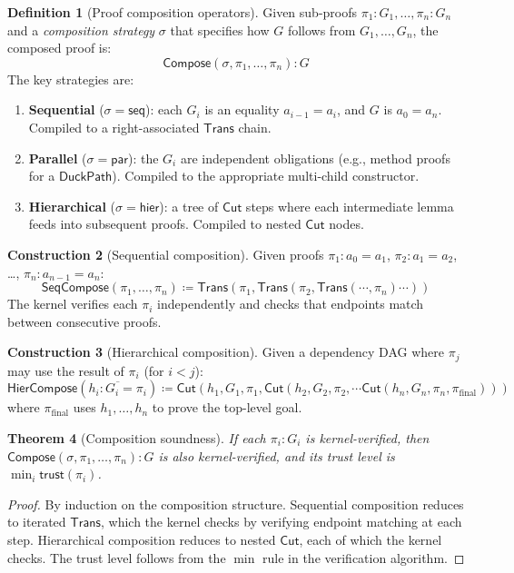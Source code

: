 \documentclass[11pt,a4paper]{report}
\theoremstyle{definition}
\newtheorem{definition}{Definition}[chapter]
\newtheorem{construction}[definition]{Construction}
\theoremstyle{plain}
\newtheorem{theorem}[definition]{Theorem}
\newcommand{\Cut}{\mathsf{Cut}}
\newcommand{\Trans}{\mathsf{Trans}}
\newcommand{\defeq}{\coloneqq}
\begin{document}
\begin{definition}[Proof composition operators]
\label{def:composition}
Given sub-proofs $\pi_1 : G_1, \ldots, \pi_n : G_n$ and a
\emph{composition strategy} $\sigma$ that specifies how $G$ follows
from $G_1, \ldots, G_n$, the composed proof is:
\[
  \mathsf{Compose}(\sigma, \pi_1, \ldots, \pi_n) : G
\]
The key strategies are:
\begin{enumerate}
  \item \textbf{Sequential} ($\sigma = \mathsf{seq}$): each $G_i$ is
    an equality $a_{i-1} = a_i$, and $G$ is $a_0 = a_n$.
    Compiled to a right-associated $\Trans$ chain.
  \item \textbf{Parallel} ($\sigma = \mathsf{par}$): the $G_i$ are
    independent obligations (e.g., method proofs for a $\mathsf{DuckPath}$).
    Compiled to the appropriate multi-child constructor.
  \item \textbf{Hierarchical} ($\sigma = \mathsf{hier}$): a tree of
    $\Cut$ steps where each intermediate lemma feeds into subsequent
    proofs. Compiled to nested $\Cut$ nodes.
\end{enumerate}
\end{definition}

\begin{construction}[Sequential composition]
\label{con:seq-compose}
Given proofs $\pi_1 : a_0 = a_1$, $\pi_2 : a_1 = a_2$, \ldots,
$\pi_n : a_{n-1} = a_n$:
\[
  \mathsf{SeqCompose}(\pi_1, \ldots, \pi_n) \defeq
    \Trans(\pi_1, \Trans(\pi_2, \Trans(\cdots, \pi_n) \cdots ))
\]
The kernel verifies each $\pi_i$ independently and checks that
endpoints match between consecutive proofs.
\end{construction}

\begin{construction}[Hierarchical composition]
\label{con:hier-compose}
Given a dependency DAG where $\pi_j$ may use the result of $\pi_i$
(for $i < j$):
\[
  \mathsf{HierCompose}(\overline{h_i : G_i = \pi_i}) \defeq
    \Cut(h_1, G_1, \pi_1,
      \Cut(h_2, G_2, \pi_2,
        \cdots
          \Cut(h_n, G_n, \pi_n, \pi_{\mathrm{final}})))
\]
where $\pi_{\mathrm{final}}$ uses $h_1, \ldots, h_n$ to prove the
top-level goal.
\end{construction}

\begin{theorem}[Composition soundness]
If each $\pi_i : G_i$ is kernel-verified, then
$\mathsf{Compose}(\sigma, \pi_1, \ldots, \pi_n) : G$ is also
kernel-verified, and its trust level is
$\min_i \mathsf{trust}(\pi_i)$.
\end{theorem}
\begin{proof}
By induction on the composition structure. Sequential composition
reduces to iterated $\Trans$, which the kernel checks by verifying
endpoint matching at each step. Hierarchical composition reduces to
nested $\Cut$, each of which the kernel checks. The trust level
follows from the $\min$ rule in the verification algorithm.
\end{proof}
\end{document}
